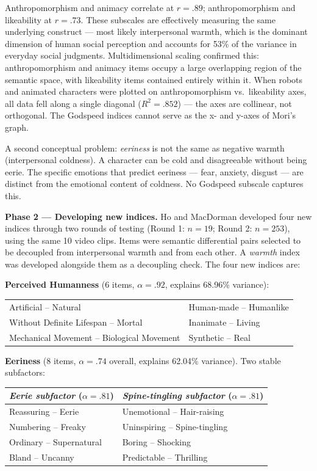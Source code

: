\documentclass[11pt, a4paper]{article}
\begin{document}
Anthropomorphism and animacy correlate at $r = .89$; anthropomorphism and likeability at $r = .73$. These subscales are effectively measuring the same underlying construct --- most likely interpersonal warmth, which is the dominant dimension of human social perception and accounts for 53\% of the variance in everyday social judgments. Multidimensional scaling confirmed this: anthropomorphism and animacy items occupy a large overlapping region of the semantic space, with likeability items contained entirely within it. When robots and animated characters were plotted on anthropomorphism vs.\ likeability axes, all data fell along a single diagonal ($R^2 = .852$) --- the axes are collinear, not orthogonal. The Godspeed indices cannot serve as the x- and y-axes of Mori's graph.

A second conceptual problem: \textit{eeriness} is not the same as negative warmth (interpersonal coldness). A character can be cold and disagreeable without being eerie. The specific emotions that predict eeriness --- fear, anxiety, disgust --- are distinct from the emotional content of coldness. No Godspeed subscale captures this.

\textbf{Phase 2 --- Developing new indices.} Ho and MacDorman developed four new indices through two rounds of testing (Round 1: $n = 19$; Round 2: $n = 253$), using the same 10 video clips. Items were semantic differential pairs selected to be decoupled from interpersonal warmth and from each other. A \textit{warmth} index was developed alongside them as a decoupling check. The four new indices are:

\textbf{Perceived Humanness} (6 items, $\alpha = .92$, explains 68.96\% variance):

\begin{center}
\begin{tabular}{ll}
Artificial -- Natural & Human-made -- Humanlike \\
Without Definite Lifespan -- Mortal & Inanimate -- Living \\
Mechanical Movement -- Biological Movement & Synthetic -- Real \\
\end{tabular}
\end{center}

\textbf{Eeriness} (8 items, $\alpha = .74$ overall, explains 62.04\% variance). Two stable subfactors:

\begin{center}
\begin{tabular}{ll}
\toprule
\textit{Eerie subfactor} ($\alpha = .81$) & \textit{Spine-tingling subfactor} ($\alpha = .81$) \\
\midrule
Reassuring -- Eerie & Unemotional -- Hair-raising \\
Numbering -- Freaky & Uninspiring -- Spine-tingling \\
Ordinary -- Supernatural & Boring -- Shocking \\
Bland -- Uncanny & Predictable -- Thrilling \\
\bottomrule
\end{tabular}
\end{center}
\end{document}
